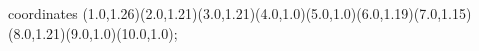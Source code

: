 					coordinates { (1.0,1.26)(2.0,1.21)(3.0,1.21)(4.0,1.0)(5.0,1.0)(6.0,1.19)(7.0,1.15)(8.0,1.21)(9.0,1.0)(10.0,1.0)};